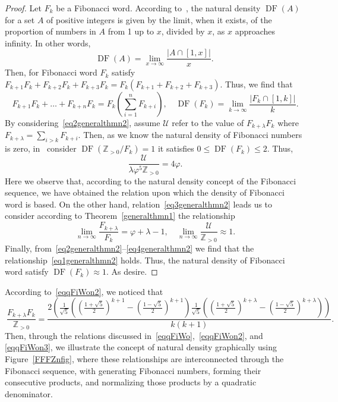 \documentclass[11pt, a4paper]{article}
\theoremstyle{definition}
\begin{document}
\begin{proof}
Let $F_k$ be a Fibonacci word. According to~\cite{Duaan1Hamoud}, the natural density $\operatorname{DF}(A)$ for a set $A$ of positive integers is given by the limit, when it exists, of the proportion of numbers in $A$ from 1 up to $x$, divided by $x$, as $x$ approaches infinity. In other words,
\[
\operatorname{DF}(A) = \lim_{x \to \infty} \frac{|A \cap [1,x]|}{x}.
\]
 Then, for Fibonacci word $F_k$ satisfy  $F_{k+1}F_k+F_{k+2}F_k+F_{k+3}F_k=F_k(F_{k+1}+F_{k+2}+F_{k+3})$. Thus, we find that
\begin{equation}~\label{eq2generalthmn2}
F_{k+1}F_k+\dots+F_{k+n}F_k=F_k\left(\sum_{i=1}^{n} F_{k+i}   \right), \quad \operatorname{DF}(F_k) = \lim_{k \to \infty} \frac{|F_k \cap [1,k]|}{k}.
\end{equation}
By considering~\eqref{eq2generalthmn2}, assume $\mathcal{U}$ refer to the value of $F_{k+\lambda}F_{k}$ where $F_{k+\lambda}=\sum_{i>k}F_{k+i}$. Then,  as we know the natural density of Fibonacci numbers is zero, in~\cite{P2021Trojovsk} consider  $\operatorname{DF}(\mathbb{Z}_{>0}/F_k)=1$ it satisfies $0\leqslant \operatorname{DF}(F_k) \leqslant 2$. Thus,  
\begin{equation}~\label{eq3generalthmn2}
\dfrac{\mathcal{U}}{\lambda \varphi^5\mathbb{Z}_{>0}}=4\varphi.
\end{equation}
Here we observe that, according to the natural density concept of the Fibonacci sequence, we have obtained the relation upon which the density of Fibonacci word is based. On the other hand, relation~\eqref{eq3generalthmn2} leads us to consider according to Theorem~\ref{generalthmn1} the relationship
\begin{equation}~\label{eq4generalthmn2}
\lim_{n\to \infty}\frac{F_{k+\lambda}}{F_{k}}=\varphi+\lambda-1, \quad \lim_{n\to \infty} \dfrac{\mathcal{U}}{\mathbb{Z}_{>0}}\approx 1.
\end{equation}
Finally, from~\eqref{eq2generalthmn2}--\eqref{eq4generalthmn2} we find that the relationship~\eqref{eq1generalthmn2} holds. Thus, the natural density of Fibonacci word satisfy $\operatorname{DF}(F_k) \approx 1$. As desire.
\end{proof}
According to~\eqref{eqqFiWon2}, we noticed that 
\begin{equation}~\label{eqqFiWon3}
 \frac{F_{k+\lambda}F_{k}}{\mathbb{Z}_{>0}}=   \frac{2\left(\frac{1}{\sqrt{5}}\left(\left(\frac{1+\sqrt{5}}{2}\right)^{k+1}-\left(\frac{1-\sqrt{5}}{2}\right)^{k+1}\right)\frac{1}{\sqrt{5}}\left(\left(\frac{1+\sqrt{5}}{2}\right)^{k+\lambda}-\left(\frac{1-\sqrt{5}}{2}\right)^{k+\lambda}\right)\right)}{k(k+1)}.
\end{equation}
Then, through the relations discussed in~\eqref{eqqFiWo},~\eqref{eqqFiWon2}, and \eqref{eqqFiWon3}, we illustrate the concept of natural density graphically using Figure~\ref{FFFZnfig}, where these relationships are interconnected through the Fibonacci sequence, with generating Fibonacci numbers, forming their consecutive products, and normalizing those products by a quadratic denominator.
\end{document}
